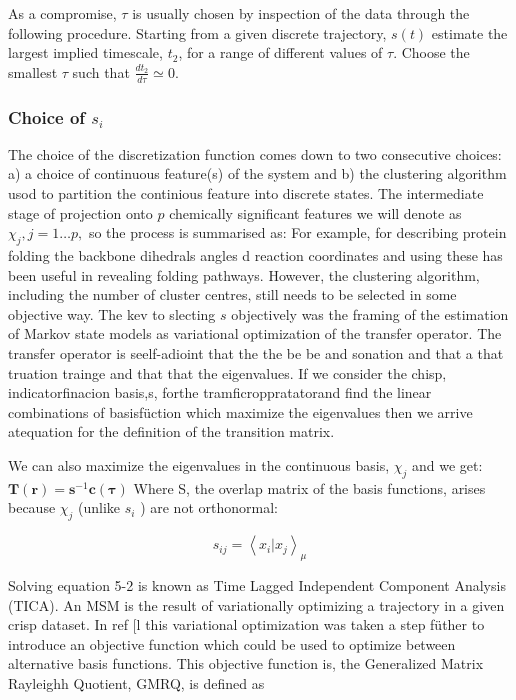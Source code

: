 As a compromise, $\tau$ is usually chosen by inspection of the data through the following procedure. Starting from a given discrete trajectory, $s(t)$ estimate the largest implied timescale, $t_{2}$, for a range of different values of $\tau$. Choose the smallest $\tau$ such that $\frac{d t_{2}}{d \tau} \simeq 0$. 

\subsubsection{Choice of $s_i$}
The choice of the discretization function comes down to two consecutive choices: a) a choice of continuous feature(s) of the system and b) the clustering algorithm usod to partition the continious feature into discrete states. The intermediate stage of projection onto $p$ chemically significant features we will denote as $\chi_{j}, j=1 \ldots p,$ so the process is summarised as:
For example, for describing protein folding the backbone dihedrals angles d reaction coordinates and using these has been useful in revealing folding pathways. However, the clustering algorithm, including the number of cluster centres, still needs to be selected in some objective way. The kev to slecting $s$ objectively was the framing of the estimation of Markov state models as variational optimization of the transfer operator. The transfer operator is seelf-adioint that the the be be and sonation and that a that truation trainge and that that the eigenvalues. If we consider the chisp, indicatorfinacion basis,s, forthe tramficroppratatorand find the linear combinations of basisfüction which maximize the eigenvalues then we arrive atequation for the definition of the transition matrix.

We can also maximize the eigenvalues in the continuous basis, $\chi_{j}$ and we get:
$\mathbf{T}(\mathbf{r})=\mathbf{s}^{-1} \mathbf{c}(\mathbf{\tau})$
Where S, the overlap matrix of the basis functions, arises because $\chi_{j}$ (unlike $s_{i}$ ) are not orthonormal:

\begin{equation}
s_{i j}=\left\langle x_{i} | x_{j}\right\rangle_{\mu}
\end{equation}

Solving equation 5-2 is known as Time Lagged Independent Component Analysis (TICA).
An MSM is the result of variationally optimizing a trajectory in a given crisp dataset. In ref $[\mathrm{l}$ this variational optimization was taken a step füther to introduce an objective function which could be used to optimize between alternative basis functions. This objective function is, the Generalized Matrix Rayleighh Quotient, GMRQ, is defined as

